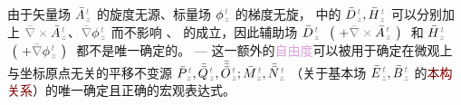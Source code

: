 由于矢量场 $\bar{A}^{\;\!\mathcolor{gray}{t}}_{\;\!\mathcolor{gray}{z}}$ 的旋度\textcolor{NavyBlue}{无源}、标量场 $\phi^{\;\!\mathcolor{gray}{t}}_{\;\!\mathcolor{gray}{z}}$ 的梯度无旋， 中的 $\bar{D}^{\;\!\mathcolor{gray}{t}}_{\;\!\mathcolor{gray}{z}}, \bar{H}^{\;\!\mathcolor{gray}{t}}_{\;\!\mathcolor{gray}{z}}$ 可以分别加上 $\mathcolor{gray}{\bar{\nabla} \times} \bar{A}^{\;\!\mathcolor{gray}{t}}_{\;\!\mathcolor{gray}{z}}$、$\mathcolor{gray}{\bar{\nabla}} \phi^{\;\!\mathcolor{gray}{t}}_{\;\!\mathcolor{gray}{z}}$ 而不影响 、 的成立，因此\textcolor{NavyBlue}{辅助场} $\bar{D}^{\;\!\mathcolor{gray}{t}}_{\;\!\mathcolor{gray}{z}}$ $~\left(~ + \mathcolor{gray}{\bar{\nabla} \times} \bar{A}^{\;\!\mathcolor{gray}{t}}_{\;\!\mathcolor{gray}{z}} ~\right)~$ 和 $\bar{H}^{\;\!\mathcolor{gray}{t}}_{\;\!\mathcolor{gray}{z}}$ $~\left(~ + \mathcolor{gray}{\bar{\nabla}} \phi^{\;\!\mathcolor{gray}{t}}_{\;\!\mathcolor{gray}{z}} ~\right)~$ 都不是唯一确定的。 ---  这一额外的\textcolor{Plum}{自由度}可以被用于确定在微观上与坐标原点无关的平移不变源 $\bar{P}^{\;\!\mathcolor{gray}{t}}_{\;\!\mathcolor{gray}{z}},\bar{\bar{Q}}^{\;\!\mathcolor{gray}{t}}_{\;\!\mathcolor{gray}{z}},\bar{\bar{\bar{O}}}^{\;\!\mathcolor{gray}{t}}_{\;\!\mathcolor{gray}{z}} ; \bar{M}^{\;\!\mathcolor{gray}{t}}_{\;\!\mathcolor{gray}{z}}, \bar{\bar{N}}^{\;\!\mathcolor{gray}{t}}_{\;\!\mathcolor{gray}{z}}$ （关于\textcolor{NavyBlue}{基本场} $\bar{E}^{\;\!\mathcolor{gray}{t}}_{\;\!\mathcolor{gray}{z}}, \bar{B}^{\;\!\mathcolor{gray}{t}}_{\;\!\mathcolor{gray}{z}}$ 的\textcolor{Maroon}{本构关系}）的唯一确定且正确的宏观表达式\cite{welterTranslationallyInvariantSemiclassical2013,delangeTranslationalInvariancePost2012,langeTransitionMicroscopicMacroscopic2012,langeMultipoleTheoryHehl2015,raabCommentOriginDependence2010a,OriginindependentCalculationQuadrupole}。

